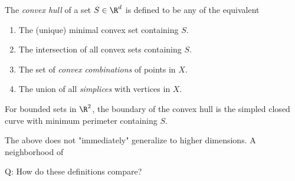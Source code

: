 \begin{defn}
	The \emph{convex hull} of a set $S \in \R^d$ is defined
	to be any of the equivalent
	\begin{enumerate}
		\item The (unique) minimal convex set containing $S$.
		\item The intersection of all convex sets containing $S$.
		\item The set of \emph{convex combinations} of points in
			$X$.
		\item The union of all \emph{simplices} with vertices in
		$X$.
	\end{enumerate}
\end{defn}

\begin{prop}
	For bounded sets in $\R^2$, the boundary of the convex hull
	is the simpled closed curve with minimum perimeter containing
	$S$.
\end{prop}

The above does not "immediately" generalize to higher dimensions.
A neighborhood of 




\begin{remark}
	Q: How do these definitions compare? 
\end{remark}

















	
	
	
	


